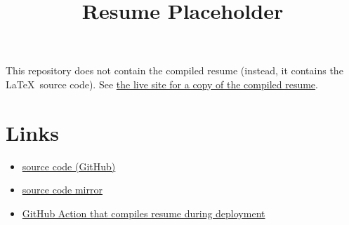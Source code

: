 \documentclass{article}
\title{Resume Placeholder}
\author{\vspace{-9ex}}
\date{\vspace{-9ex}}
\begin{document}
\maketitle
\thispagestyle{plain}

This repository does not contain the compiled resume (instead, it contains the \LaTeX\ source code).
See \href{https://jazevedo.me/resume}{the live site for a copy of the compiled resume}.

\section{Links}
\begin{itemize}
    \item \href{https://github.com/jazeved0/jazevedo.me/tree/main/src/resume/main.tex}{source code (GitHub)}
    \item \href{./source}{source code mirror}
    \item \href{https://github.com/jazeved0/jazevedo.me/tree/main/.github/workflows/deploy.yaml}{GitHub Action that compiles resume during deployment}
\end{itemize}
\end{document}
